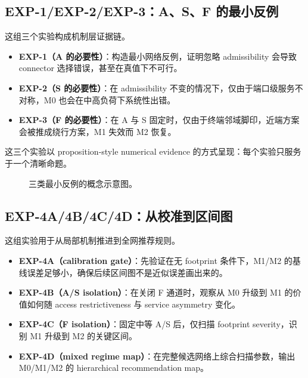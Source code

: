 \documentclass[review,authoryear]{elsarticle}
\begin{document}
\subsection{EXP-1/EXP-2/EXP-3：A、S、F 的最小反例}
\label{sec:exp:counterexamples}

这组三个实验构成机制层证据链。

\begin{itemize}
  \item \textbf{EXP-1（A 的必要性）}：构造最小网络反例，证明忽略 admissibility 会导致 connector 选择错误，甚至在真值下不可行。
  \item \textbf{EXP-2（S 的必要性）}：在 admissibility 不变的情况下，仅由于端口级服务不对称，M0 也会在中高负荷下系统性出错。
  \item \textbf{EXP-3（F 的必要性）}：在 A 与 S 固定时，仅由于终端邻域脚印，近端方案会被推成绕行方案，M1 失效而 M2 恢复。
\end{itemize}

这三个实验以 proposition-style numerical evidence 的方式呈现：每个实验只服务于一个清晰命题。

\begin{figure}[htbp]
  \centering
  \caption{三类最小反例的概念示意图。}
  \label{fig:counterexamples}
\end{figure}

\subsection{EXP-4A/4B/4C/4D：从校准到区间图}
\label{sec:exp:regime}

这组实验用于从局部机制推进到全网推荐规则。

\begin{itemize}
  \item \textbf{EXP-4A（calibration gate）}：先验证在无 footprint 条件下，M1/M2 的基线误差足够小，确保后续区间图不是近似误差画出来的。
  \item \textbf{EXP-4B（A/S isolation）}：在关闭 F 通道时，观察从 M0 升级到 M1 的价值如何随 access restrictiveness 与 service asymmetry 变化。
  \item \textbf{EXP-4C（F isolation）}：固定中等 A/S 后，仅扫描 footprint severity，识别 M1 升级到 M2 的关键区间。
  \item \textbf{EXP-4D（mixed regime map）}：在完整候选网络上综合扫描参数，输出 M0/M1/M2 的 hierarchical recommendation map。
\end{itemize}
\end{document}
